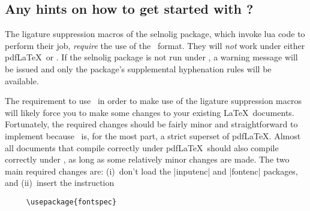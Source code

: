 \documentclass[12pt]{article}
\newcommand{\pkg}[1]{\textsf{#1}}
\begin{document}
\subsection{Any hints on how to get started with \LuaLaTeX?}

The ligature suppression macros of the \pkg{selnolig} package, which invoke lua code to perform their job, \emph{require} the use of the \LuaLaTeX\ format. They will \emph{not} work under either pdf\LaTeX\ or \XeLaTeX. If the \pkg{selnolig} package is not run under \LuaLaTeX, a warning message will be issued and only the package's supplemental hyphenation rules will be available.

The requirement to use \LuaLaTeX\ in order to make use of the ligature suppression macros will likely force you to make some changes to your existing \LaTeX\ documents. Fortunately, the required changes should be fairly minor and straightforward to implement because \LuaLaTeX\ is, for the most part, a strict superset of pdf\LaTeX. Almost all documents that compile correctly under pdf\LaTeX\ should also compile correctly under \LuaLaTeX, as long as some relatively minor changes are made.
The two main required changes are: (i)~don't load the |inputenc| and |fontenc| packages, and (ii)~insert the instruction
\begin{Verbatim}
     \usepackage{fontspec}
\end{Verbatim}
\end{document}
